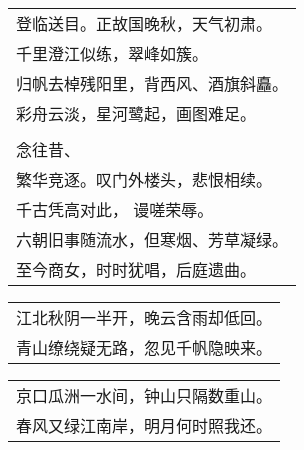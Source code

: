 \nopagebreak%
\nopagebreak%
\noindent\begin{minipage}{\linewidth}
  \vskip-3pt\begin{table}[H]
    \centering
    \begin{tabular}{@{}l@{}}
登临送目。正故国晚秋，天气初肃。\\
千里澄江似练，翠峰如簇。\\
归帆去棹残阳里，背西风、酒旗斜矗。\\
彩舟云淡，星河鹭起，画图难足。\\
\\
念往昔、\\
繁华竞逐。叹门外楼头，悲恨相续。\\
千古凭高对此， 谩嗟荣辱。\\
六朝旧事随流水，但寒烟、芳草凝绿。\\
至今商女，时时犹唱，后庭遗曲。
    \end{tabular}
  \end{table}
\end{minipage}
\vspace{1cm}


\nopagebreak%
\nopagebreak%
\noindent\begin{minipage}{\linewidth}
  \vskip-3pt\begin{table}[H]
    \centering
    \begin{tabular}{@{}l@{}}
江北秋阴一半开，晚云含雨却低回。\\
青山缭绕疑无路，忽见千帆隐映来。
    \end{tabular}
  \end{table}
\end{minipage}
\vspace{1cm}


\nopagebreak%
\nopagebreak%
\noindent\begin{minipage}{\linewidth}
  \vskip-3pt\begin{table}[H]
    \centering
    \begin{tabular}{@{}l@{}}
京口瓜洲一水间，钟山只隔数重山。\\
春风又绿江南岸，明月何时照我还。
    \end{tabular}
  \end{table}
\end{minipage}
\vspace{1cm}


